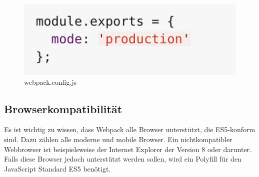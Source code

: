 \begin{figure}[H]
	\begin{center}
		\includegraphics[scale=.7]{images/webpack-mode.png}
	\end{center}
		\caption{webpack.config.js}
\end{figure}

\subsection{Browserkompatibilität}
Es ist wichtig zu wissen, dass Webpack alle Browser unterstützt, die ES5-konform sind. Dazu zählen alle moderne und mobile Browser. Ein nichtkompatibler Webbrowser ist beispielsweise der Internet Explorer der Version 8 oder darunter. Falls diese Browser jedoch unterstützt werden sollen, wird ein Polyfill für den JavaScript Standard ES5 benötigt.










